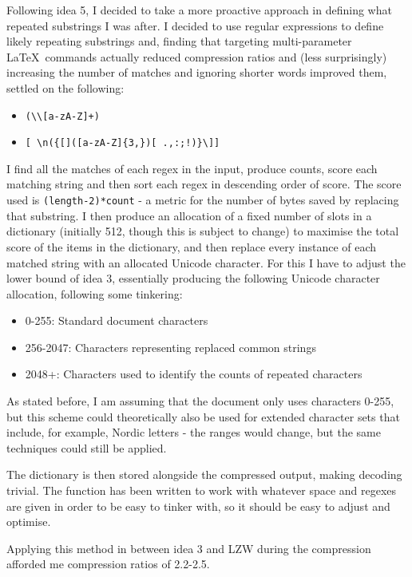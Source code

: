 \documentclass[11pt]{article} %
\begin{document}
Following idea 5, I decided to take a more proactive approach in defining what repeated substrings I was after. I decided to use regular expressions to define likely repeating substrings and, finding that targeting multi-parameter \rmfamily\LaTeX\normalfont\ commands actually reduced compression ratios and (less surprisingly) increasing the number of matches and ignoring shorter words improved them, settled on the following:

\begin{itemize}
	\item \verb|(\\[a-zA-Z]+)|
	\item \verb|[ \n({[]([a-zA-Z]{3,})[ .,:;!)}\]]|
\end{itemize}

I find all the matches of each regex in the input, produce counts, score each matching string and then sort each regex in descending order of score. The score used is \verb|(length-2)*count| - a metric for the number of bytes saved by replacing that substring. I then produce an allocation of a fixed number of slots in a dictionary (initially 512, though this is subject to change) to maximise the total score of the items in the dictionary, and then replace every instance of each matched string with an allocated Unicode character. For this I have to adjust the lower bound of idea 3, essentially producing the following Unicode character allocation, following some tinkering:

\begin{itemize}
	\item 0-255: Standard document characters
	\item 256-2047: Characters representing replaced common strings
	\item 2048+: Characters used to identify the counts of repeated characters
\end{itemize}

As stated before, I am assuming that the document only uses characters 0-255, but this scheme could theoretically also be used for extended character sets that include, for example, Nordic letters - the ranges would change, but the same techniques could still be applied.

The dictionary is then stored alongside the compressed output, making decoding trivial. The function has been written to work with whatever space and regexes are given in order to be easy to tinker with, so it should be easy to adjust and optimise.

Applying this method in between idea 3 and LZW during the compression afforded me compression ratios of 2.2-2.5.
\end{document}
